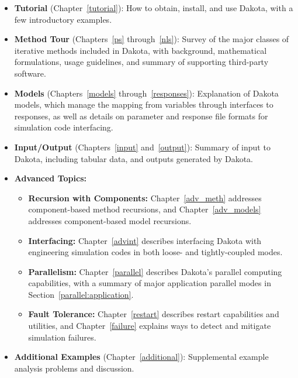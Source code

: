 \begin{itemize}

\item {\bf Tutorial} (Chapter~\ref{tutorial}): How to obtain, install,
  and use Dakota, with a few introductory examples.

\item {\bf Method Tour} (Chapters~\ref{ps} through~\ref{nls}): Survey
  of the major classes of iterative methods included in Dakota, with
  background, mathematical formulations, usage guidelines, and summary
  of supporting third-party software.

\item {\bf Models} (Chapters~\ref{models} through~\ref{responses}):
  Explanation of Dakota models, which manage the mapping from
  variables through interfaces to responses, as well as details on
  parameter and response file formats for simulation code interfacing.

\item {\bf Input/Output} (Chapters~\ref{input} and~\ref{output}):
  Summary of input to Dakota, including tabular data, and outputs
  generated by Dakota.

\item {\bf Advanced Topics:}
  \begin{itemize}

  \item {\bf Recursion with Components:} Chapter~\ref{adv_meth}
    addresses component-based method recursions, and
    Chapter~\ref{adv_models} addresses component-based model recursions.

  \item {\bf Interfacing:} Chapter~\ref{advint} describes interfacing
    Dakota with engineering simulation codes in both loose- and
    tightly-coupled modes.

  \item {\bf Parallelism:} Chapter~\ref{parallel} describes Dakota's
    parallel computing capabilities, with a summary of major
    application parallel modes in Section~\ref{parallel:application}.

  \item {\bf Fault Tolerance:} Chapter~\ref{restart} describes restart
    capabilities and utilities, and Chapter~\ref{failure} explains ways
    to detect and mitigate simulation failures.

  \end{itemize}

\item {\bf Additional Examples} (Chapter~\ref{additional}):
  Supplemental example analysis problems and discussion.

\end{itemize}

